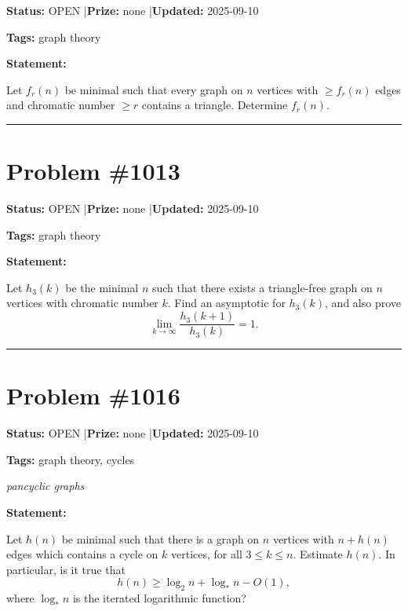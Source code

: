 \documentclass{article}
\begin{document}
\noindent\textbf{Status:} OPEN \quad|\quad \textbf{Prize:} none \quad|\quad \textbf{Updated:} 2025-09-10

\noindent\textbf{Tags:} graph theory

\medskip

\noindent\textbf{Statement:}

Let $f_r(n)$ be minimal such that every graph on $n$ vertices with $\geq f_r(n)$ edges and chromatic number $\geq r$ contains a triangle. Determine $f_r(n)$.

\noindent\rule{\linewidth}{0.4pt}


\section{Problem \#1013}
\label{prob:1013}

\noindent\textbf{Status:} OPEN \quad|\quad \textbf{Prize:} none \quad|\quad \textbf{Updated:} 2025-09-10

\noindent\textbf{Tags:} graph theory

\medskip

\noindent\textbf{Statement:}

Let $h_3(k)$ be the minimal $n$ such that there exists a triangle-free graph on $n$ vertices with chromatic number $k$. Find an asymptotic for $h_3(k)$, and also prove\[\lim_{k\to \infty}\frac{h_3(k+1)}{h_3(k)}=1.\]

\noindent\rule{\linewidth}{0.4pt}


\section{Problem \#1016}
\label{prob:1016}

\noindent\textbf{Status:} OPEN \quad|\quad \textbf{Prize:} none \quad|\quad \textbf{Updated:} 2025-09-10

\noindent\textbf{Tags:} graph theory, cycles

\medskip
\noindent\textit{pancyclic graphs}


\noindent\textbf{Statement:}

Let $h(n)$ be minimal such that there is a graph on $n$ vertices with $n+h(n)$ edges which contains a cycle on $k$ vertices, for all $3\leq k\leq n$. Estimate $h(n)$. In particular, is it true that\[h(n) \geq \log_2n+\log_*n-O(1),\]where $\log_*n$ is the iterated logarithmic function?
\end{document}

